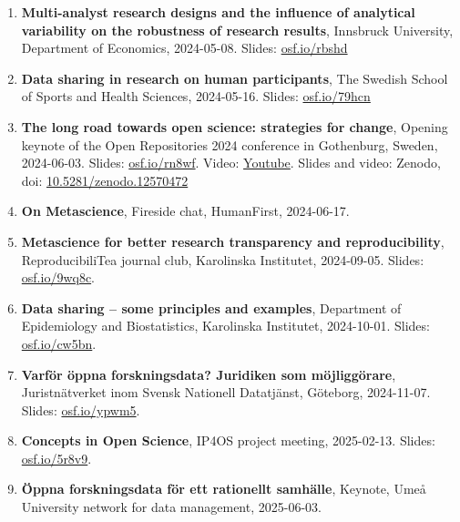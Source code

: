 \documentclass[10pt]{article}
\begin{document}
\begin{enumerate}[nolistsep]
\item \textbf{Multi-analyst research designs and the influence of analytical variability on the robustness of research results}, Innsbruck University, Department of Economics, 2024-05-08. Slides: \href{https://osf.io/rbshd}{osf.io/rbshd}
\item \textbf{Data sharing in research on human participants}, The Swedish School of Sports and Health Sciences, 2024-05-16. Slides: \href{https://osf.io/79hcn}{osf.io/79hcn}
\item \textbf{The long road towards open science: strategies for change}, Opening keynote of the Open Repositories 2024 conference in Gothenburg, Sweden, 2024-06-03. Slides: \href{https://osf.io/rn8wf}{osf.io/rn8wf}. Video: \href{https://www.youtube.com/watch?v=svJvq1cot5k}{Youtube}. Slides and video: Zenodo, doi: \href{https://doi.org/10.5281/zenodo.12570472}{10.5281/zenodo.12570472}
\item \textbf{On Metascience}, Fireside chat, HumanFirst, 2024-06-17. 
\item \textbf{Metascience for better research transparency and reproducibility}, ReproducibiliTea journal club, Karolinska Institutet, 2024-09-05. Slides: \href{https://osf.io/9wq8c}{osf.io/9wq8c}. 
\item \textbf{Data sharing – some principles and examples}, Department of Epidemiology and Biostatistics, Karolinska Institutet, 2024-10-01. Slides: \href{https://osf.io/cw5bn}{osf.io/cw5bn}. 
\item \textbf{Varför öppna forskningsdata? Juridiken som möjliggörare}, Juristnätverket inom Svensk Nationell Datatjänst, Göteborg, 2024-11-07. Slides: \href{https://osf.io/ypwm5}{osf.io/ypwm5}. 

\item \textbf{Concepts in Open Science}, IP4OS project meeting, 2025-02-13. Slides: \href{https://osf.io/5r8v9}{osf.io/5r8v9}. 

\item \textbf{Öppna forskningsdata för ett rationellt samhälle}, Keynote, Umeå University network for data management, 2025-06-03. 

\end{enumerate}
\end{document}
